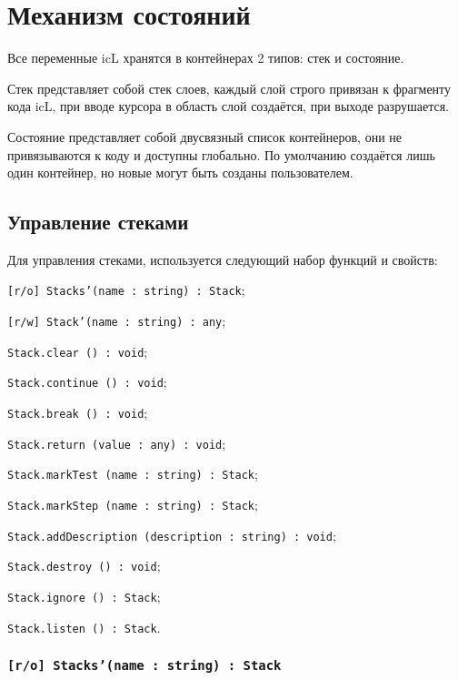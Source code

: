 \section{Механизм состояний}

Все переменные icL хранятся в контейнерах 2 типов: стек и состояние.

Стек представляет собой стек слоев, каждый слой строго привязан к фрагменту кода icL, при вводе курсора в область слой создаётся, при выходе разрушается.

Состояние представляет собой двусвязный список контейнеров, они не привязываются к коду и доступны глобально. По умолчанию создаётся лишь один контейнер, но новые могут быть созданы пользователем.

\subsection{Управление стеками}
\label{stack:control}

Для управления стеками, используется следующий набор функций и свойств:
\begin{icItems}
	\item \texttt{[r/o] Stacks'(name : string) : Stack};
	\item \texttt{[r/w] Stack'(name : string) : any};
	\item \texttt{Stack.clear () : void};
	\item \texttt{Stack.continue () : void};
	\item \texttt{Stack.break () : void};
	\item \texttt{Stack.return (value : any) : void};
	\item \texttt{Stack.markTest (name : string) : Stack};
	\item \texttt{Stack.markStep (name : string) : Stack};
	\item \texttt{Stack.addDescription (description : string) : void};
	\item \texttt{Stack.destroy () : void};
	\item \texttt{Stack.ignore () : Stack};
	\item \texttt{Stack.listen () : Stack}.
\end{icItems}

\subsubsection{\texttt{[r/o] Stacks'(name : string) : Stack}}


